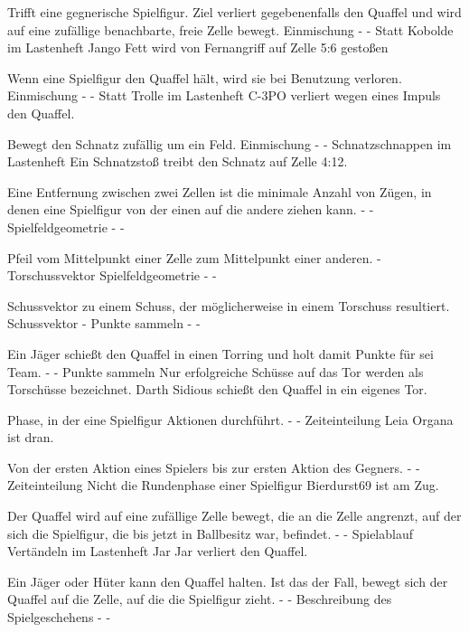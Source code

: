 {Trifft eine gegnerische Spielfigur. Ziel verliert gegebenenfalls den Quaffel und wird auf eine zufällige benachbarte, freie Zelle bewegt.}
{Einmischung}
{-}
{-}
{Statt \glqq{}Kobolde\grqq{}  im Lastenheft}
{Jango Fett wird von Fernangriff auf Zelle 5:6 gestoßen}

{Wenn eine Spielfigur den Quaffel hält, wird sie bei Benutzung verloren.}
{Einmischung}
{-}
{-}
{Statt \glqq{}Trolle\grqq{}  im Lastenheft}
{C-3PO verliert wegen eines Impuls den Quaffel.}

{Bewegt den Schnatz zufällig um ein Feld.}
{Einmischung}
{-}
{-}
{\glqq{}Schnatzschnappen\grqq{}  im Lastenheft}
{Ein Schnatzstoß treibt den Schnatz auf Zelle 4:12.}

{Eine Entfernung zwischen zwei Zellen ist die minimale Anzahl von Zügen, in denen eine Spielfigur von der einen auf die andere ziehen kann.}
{-}
{-}
{Spielfeldgeometrie}
{-}
{-}

{Pfeil vom Mittelpunkt einer Zelle zum Mittelpunkt einer anderen.}
{-}
{Torschussvektor}
{Spielfeldgeometrie}
{-}
{-}

{Schussvektor zu einem Schuss, der möglicherweise in einem Torschuss resultiert.}
{Schussvektor}
{-}
{Punkte sammeln}
{-}
{-}

{Ein Jäger schießt den Quaffel in einen Torring und holt damit Punkte für sei Team.}
{-}
{-}
{Punkte sammeln}
{Nur erfolgreiche Schüsse auf das Tor werden als Torschüsse bezeichnet.}
{Darth Sidious schießt den Quaffel in ein eigenes Tor.}

{Phase, in der eine Spielfigur Aktionen durchführt.}
{-}
{-}
{Zeiteinteilung}
{}
{Leia Organa ist dran.}

{Von der ersten Aktion eines Spielers bis zur ersten Aktion des Gegners.}
{-}
{-}
{Zeiteinteilung}
{Nicht die Rundenphase einer Spielfigur}
{Bierdurst69 ist am Zug.}

{Der Quaffel wird auf eine zufällige Zelle bewegt, die an die Zelle angrenzt, auf der sich die Spielfigur, die bis jetzt in Ballbesitz war, befindet.}
{-}
{-}
{Spielablauf}
{\glqq{}Vertändeln\grqq{}  im Lastenheft}
{Jar Jar verliert den Quaffel.}

{Ein Jäger oder Hüter kann den Quaffel halten. Ist das der Fall, bewegt sich der Quaffel auf die Zelle, auf die die Spielfigur zieht.}
{-}
{-}
{Beschreibung des Spielgeschehens}
{-}
{-}

